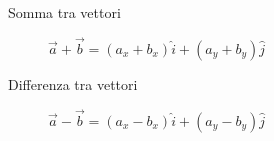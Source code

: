 \documentclass[a4paper,11pt,italian]{article}
\begin{document}
\begin{description}
%

  \item[Somma tra vettori]
  $ \vec{a} + \vec{b} =  (a_x + b_x) \hat{i} + (a_y + b_y) \hat{j}  $
  
  \item[Differenza tra vettori]
%
  $\vec{a} - \vec{b} =  (a_x - b_x) \hat{i} + (a_y - b_y) \hat{j} $


\end{description}
\end{document}
